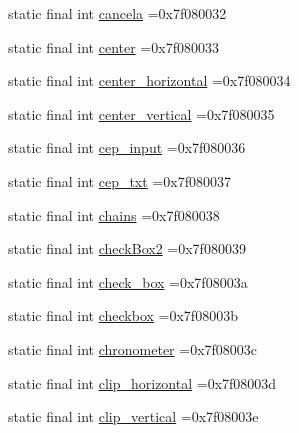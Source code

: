 \begin{DoxyCompactItemize}
\item 
static final int \mbox{\hyperlink{classbr_1_1unb_1_1cic_1_1mp_1_1marketmaster_1_1R_1_1id_ad3ecb4f7c04bdf006e8f75db0daf45ff}{cancela}} =0x7f080032
\item 
static final int \mbox{\hyperlink{classbr_1_1unb_1_1cic_1_1mp_1_1marketmaster_1_1R_1_1id_a4b27df47cacf6f533134679b255847e7}{center}} =0x7f080033
\item 
static final int \mbox{\hyperlink{classbr_1_1unb_1_1cic_1_1mp_1_1marketmaster_1_1R_1_1id_abb61d1a2008291da9b50ffa09af35aed}{center\+\_\+horizontal}} =0x7f080034
\item 
static final int \mbox{\hyperlink{classbr_1_1unb_1_1cic_1_1mp_1_1marketmaster_1_1R_1_1id_a5225242f844ce7bcb6bd99cb93a30dce}{center\+\_\+vertical}} =0x7f080035
\item 
static final int \mbox{\hyperlink{classbr_1_1unb_1_1cic_1_1mp_1_1marketmaster_1_1R_1_1id_a8239a2aa8b868357cbde11d71b4cdc4e}{cep\+\_\+input}} =0x7f080036
\item 
static final int \mbox{\hyperlink{classbr_1_1unb_1_1cic_1_1mp_1_1marketmaster_1_1R_1_1id_a44c8e0c96dd2fd220075c38058e15f2f}{cep\+\_\+txt}} =0x7f080037
\item 
static final int \mbox{\hyperlink{classbr_1_1unb_1_1cic_1_1mp_1_1marketmaster_1_1R_1_1id_abd0364783e2be9234b72b0cb82409373}{chains}} =0x7f080038
\item 
static final int \mbox{\hyperlink{classbr_1_1unb_1_1cic_1_1mp_1_1marketmaster_1_1R_1_1id_a05252bdf023ea51fdc56f2695cf9ef43}{check\+Box2}} =0x7f080039
\item 
static final int \mbox{\hyperlink{classbr_1_1unb_1_1cic_1_1mp_1_1marketmaster_1_1R_1_1id_a61a68e5b762bcbf8e66f85cd1a92d1e3}{check\+\_\+box}} =0x7f08003a
\item 
static final int \mbox{\hyperlink{classbr_1_1unb_1_1cic_1_1mp_1_1marketmaster_1_1R_1_1id_a734cb8563ad229be14eae782cb162e80}{checkbox}} =0x7f08003b
\item 
static final int \mbox{\hyperlink{classbr_1_1unb_1_1cic_1_1mp_1_1marketmaster_1_1R_1_1id_a2b18c9b0bdb1f6892e8e065db7cfb692}{chronometer}} =0x7f08003c
\item 
static final int \mbox{\hyperlink{classbr_1_1unb_1_1cic_1_1mp_1_1marketmaster_1_1R_1_1id_a60a8ba7f91210d9fd0f5eb9311361765}{clip\+\_\+horizontal}} =0x7f08003d
\item 
static final int \mbox{\hyperlink{classbr_1_1unb_1_1cic_1_1mp_1_1marketmaster_1_1R_1_1id_a4bbbe247bdcd4a2be04e1ac8beb03649}{clip\+\_\+vertical}} =0x7f08003e
\item 

\end{DoxyCompactItemize}
